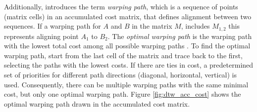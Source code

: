 Additionally, \textcite{muller2007dynamic} introduces the term \textit{warping path}, which is a sequence of points (matrix cells) in an accumulated cost matrix, that defines alignment between two sequences. If a warping path for $A$ and $B$ in the matrix $M$, includes $M_{1,2}$ this represents aligning point $A_1$ to $B_2$. The \textit{optimal warping path} is the warping path with the lowest total cost among all possible warping paths \cite{muller2007dynamic}. To find the optimal warping path, start from the last cell of the matrix and trace back to the first, selecting the paths with the lowest costs. If there are ties in cost, a predetermined set of priorities for different path directions (diagonal, horizontal, vertical) is used. Consequently, there can be multiple warping paths with the same minimal cost, but only one optimal warping path. Figure \ref{fig:dtw_acc_cost} shows the optimal warping path drawn in the accumulated cost matrix.

